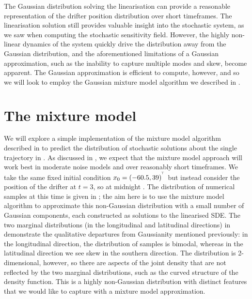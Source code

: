 The Gaussian distribution solving the linearisation can provide a reasonable representation of the drifter position distribution over short timeframes.
The linearisation solution still provides valuable insight into the stochastic system, as we saw when computing the stochastic sensitivity field.
However, the highly non-linear dynamics of the system quickly drive the distribution away from the Gaussian distribution, and the aforementioned limitations of a Gaussian approximation, such as the inability to capture multiple modes and skew, become apparent.
The Gaussian approximation is efficient to compute, however, and so we will look to employ the Gaussian mixture model algorithm we described in .


\section{The mixture model}
We will explore a simple implementation of the mixture model algorithm described in  to predict the distribution of stochastic solutions about the single trajectory in .
As discussed in , we expect that the mixture model approach will work best in moderate noise models and over reasonably short timeframes.
We take the same fixed initial condition \(x_0 = \left(-60.5, 39\right)^{^{\!\top}}\) but instead consider the position of the drifter at \(t = 3\), so at midnight .
The distribution of numerical samples at this time is given in ; the aim here is to use the mixture model algorithm to approximate this non-Gaussian distribution with a small number of Gaussian components, each constructed as solutions to the linearised SDE.
The two marginal distributions (in the longitudinal and latitudinal directions) in  demonstrate the qualitative departures from Gaussianity mentioned previously: in the longitudinal direction, the distribution of samples is bimodal, whereas in the latitudinal direction we see skew in the southern direction.
The distribution is 2-dimensional, however, so there are aspects of the joint density that are not reflected by the two marginal distributions, such as the curved structure of the density function.
This is a highly non-Gaussian distribution with distinct features that we would like to capture with a mixture model approximation.

